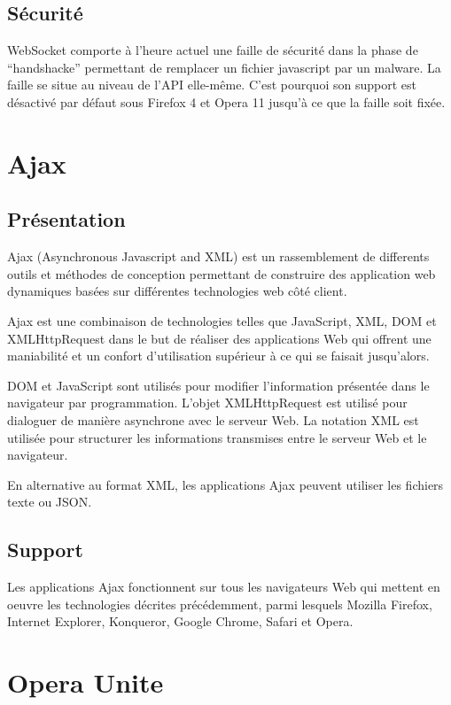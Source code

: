 \documentclass[a4paper,10pt]{report}
\begin{document}
    \subsection{Sécurité}

WebSocket comporte à l'heure actuel une faille de sécurité dans la phase 
de ``handshacke'' permettant de remplacer un fichier javascript par un malware. 
La faille se situe au niveau de l'API elle-même. C'est pourquoi son support 
est désactivé par défaut sous Firefox 4 et Opera 11 jusqu'à ce que la faille 
soit fixée.


  \section{Ajax}

    \subsection{Présentation}

Ajax (Asynchronous Javascript and XML) est un rassemblement de differents outils 
et méthodes de conception permettant de construire des application web dynamiques
basées sur différentes technologies web côté client.

Ajax est une combinaison de technologies telles que JavaScript, XML, DOM et 
XMLHttpRequest dans le but de réaliser des applications Web qui offrent une 
maniabilité et un confort d'utilisation supérieur à ce qui se faisait jusqu'alors.

DOM et JavaScript sont utilisés pour modifier l'information présentée dans le navigateur 
par programmation. L'objet XMLHttpRequest est utilisé pour dialoguer de manière 
asynchrone avec le serveur Web. La notation XML est utilisée pour structurer les 
informations transmises entre le serveur Web et le navigateur.

En alternative au format XML, les applications Ajax peuvent utiliser les fichiers texte ou JSON.

  \subsection{Support}

Les applications Ajax fonctionnent sur tous les navigateurs Web qui mettent en oeuvre les 
technologies décrites précédemment, parmi lesquels Mozilla Firefox, Internet Explorer, 
Konqueror, Google Chrome, Safari et Opera.


  \section{Opera Unite}
\end{document}

